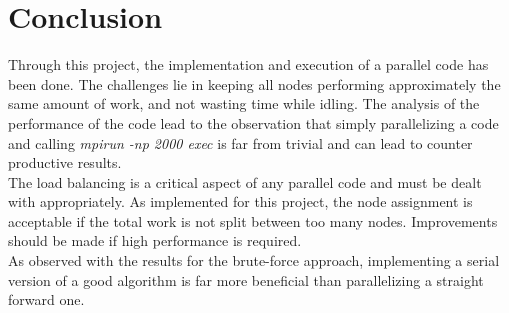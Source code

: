 \section{Conclusion}
Through this project, the implementation and execution of a parallel code has been done. The challenges lie in keeping all nodes performing approximately the same amount of work, and not wasting time while idling. The analysis of the performance of the code lead to the observation that simply parallelizing a code and calling \textit{mpirun -np 2000 exec} is far from trivial and can lead to counter productive results.\\
The load balancing is a critical aspect of any parallel code and must be dealt with appropriately. As implemented for this project, the node assignment is acceptable if the total work is not split between too many nodes. Improvements should be made if high performance is required.\\
As observed with the results for the brute-force approach, implementing a serial version of a good algorithm is far more beneficial than parallelizing a straight forward one.
